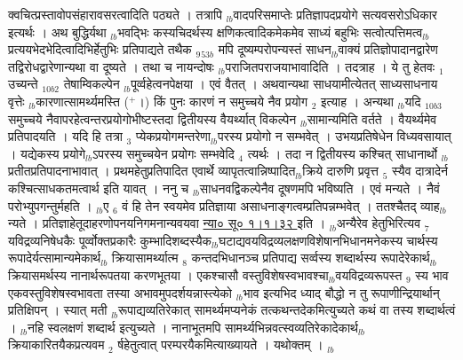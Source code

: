 \documentclass[article,12pt,a4paper]{memoir}%
\newcommand{\add}[1]{($^{+}$#1)}
\newcounter{parCount}
\begin{document}
क्वचित्प्रस्तावोपसंहारावसरत्वादिति पठ्यते । तत्रापि {\tiny $_{lb}$}वादपरिसमाप्तेः प्रतिज्ञापदप्रयोगे सत्यवसरोऽधिकार इत्यर्थः । अथ बुद्धिर्यथा {\tiny $_{lb}$}भवद्भिः कस्यचिदर्थस्य क्षणिकत्वादिकमेकमेव साध्यं बहुभिः सत्वोत्पत्तिमत्व{\tiny $_{lb}$}प्रत्ययभेदभेदित्वादिभिर्हेतुभिः प्रतिपाद्यते तथैक {\tiny $_{9}$}{\tiny $_{53b}$} मपि दूष्यम्परोपन्यस्तं साधन{\tiny $_{lb}$}वाक्यं प्रतिज्ञोपादानद्वारेण तद्विरोधद्वारेणान्यथा वा दूष्यते । तथा च नायन्दोषः {\tiny $_{lb}$}पराजितपराजयाभावादिति । तदत्राह । ये तु हेतवः {\tiny $_{1}$} उच्यन्ते {\tiny $_{10b2}$} तेषाम्विकल्पेन {\tiny $_{lb}$}पूर्व्वहेत्वनपेक्षया । एवं वैतत् । अथवान्यथा साधयामीत्येतत् साध्यसाधनाय वृत्तेः {\tiny $_{lb}$}कारणात्सामर्थ्यमस्ति \add{।} किं पुनः कारणं न समुच्चये नैव प्रयोग {\tiny $_{2}$} इत्याह । {\color{DodgerBlue3}अन्यथा {\tiny $_{lb}$}यदि} {\tiny $_{10b3}$} समुच्चये नैवापरहेत्वन्तरप्रयोगोभीष्टस्तदा द्वितीयस्य वैयर्थ्यात् विकल्पेन {\tiny $_{lb}$}सामान्यमिति वर्तते । वैयर्थ्यमेव प्रतिपादयति । यदि हि तत्रा {\tiny $_{3}$} प्येकप्रयोगमन्तरेणा{\tiny $_{lb}$}परस्य प्रयोगो न सम्भवेत् । उभयप्रतिषेधेन विध्यवसायात् । यद्येकस्य प्रयोगे{\tiny $_{lb}$}ऽपरस्य समुच्चयेन प्रयोगः सम्भवेदि {\tiny $_{4}$} त्यर्थः । तदा न द्वितीयस्य कश्चित् साधानार्थो {\tiny $_{lb}$}प्रतीतप्रतिपादनाभावात् । प्रथमहेतुप्रतिपादित एवार्थे व्यापृतत्वान्निष्पादित{\tiny $_{lb}$}क्रिये दारुणि प्रवृत्त {\tiny $_{5}$} स्यैव दात्रादेर्न कश्चित्साधकतमत्वार्थ इति यावत् । ननु च {\tiny $_{lb}$}साधनवद्विकल्पेनैव दूषणमपि भविष्यति । एवं मन्यते । नैवं परोभ्युपगन्तुर्महति । {\tiny $_{lb}$}ए {\tiny $_{6}$} वं हि तेन स्वयमेव प्रतिज्ञाया असाधनाङ्गत्वम्प्रतिपन्नम्भवेत् । ततश्चैतद् व्याह{\tiny $_{lb}$}न्यते । प्रतिज्ञाहेतूदाहरणोपनयनिगमनान्यवयवा \href{http://sarit.indology.info/?cref=ns\%C5\%AB.1.1.32}{न्या० सू० १।१।३२ } इति । {\tiny $_{lb}$}अन्यैरेव हेतुभिरित्यव {\tiny $_{7}$} यविद्रव्यनिषेधकैः पूर्व्वोक्तप्रकारैः कुम्भादिशब्दस्यैक{\tiny $_{lb}$}घटाद्यवयविद्रव्यलक्षणविशेषानभिधानमनेकस्य चार्थस्य रूपादेर्यत्सामान्यमेकार्थ{\tiny $_{lb}$} \leavevmode{} क्रियासामर्थ्यात्म {\tiny $_{8}$} कन्तदभिधानञ्च प्रतिपाद्य सर्व्वस्य शब्दार्थस्य रूपादेरेकार्थ{\tiny $_{lb}$}क्रियासमर्थस्य नानार्थरूपतया करणभूतया । एकश्चासौ वस्तुविशेषस्वभावश्चा{\tiny $_{lb}$}वयविद्रव्यरूपस्त {\tiny $_{9}$} \leavevmode{} स्य भाव एकवस्तुविशेषस्वभावता तस्या अभावमुपदर्शयन्नास्त्येको {\tiny $_{lb}$}भाव इत्यभिद {\color{DodgerBlue3}ध्याद्} बौद्धो न तु रूपाणीन्द्रियार्थान् प्रतिक्षिपन् । स्यात् मती {\tiny $_{lb}$}रूपाद्यव्यतिरेकात् सामर्थ्यमप्यनेकं तत्कथन्तदेकमित्युच्यते कथं वा तस्य शब्दार्थत्वं । {\tiny $_{lb}$}नहि स्वलक्षणं शब्दार्थ इत्युच्यते । नानाभूतमपि सामर्थ्यभिन्नवत्स्वव्यतिरेकादेकार्थ{\tiny $_{lb}$}क्रियाकारितयैकप्रत्यवम {\tiny $_{2}$} र्षहेतुत्वात् परम्परयैकमित्याख्यायते । यथोक्तम् ।
	{}
	\pend%
      {\tiny $_{lb}$}
	  \bigskip
	  \begingroup
	
\end{document}
